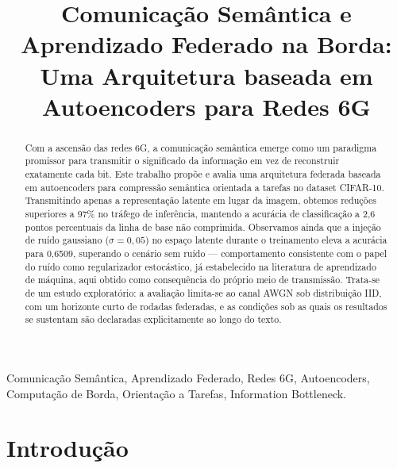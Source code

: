 \documentclass[conference]{IEEEtran}
\begin{document}
\title{Comunicação Semântica e Aprendizado Federado na Borda: Uma Arquitetura baseada em Autoencoders para Redes 6G}

\author{
}

\maketitle

\begin{abstract}
Com a ascensão das redes 6G, a comunicação semântica emerge como um paradigma promissor para transmitir o significado da informação em vez de reconstruir exatamente cada bit. Este trabalho propõe e avalia uma arquitetura federada baseada em autoencoders para compressão semântica orientada a tarefas no dataset CIFAR-10. Transmitindo apenas a representação latente em lugar da imagem, obtemos reduções superiores a 97\% no tráfego de inferência, mantendo a acurácia de classificação a 2,6 pontos percentuais da linha de base não comprimida. Observamos ainda que a injeção de ruído gaussiano ($\sigma=0,05$) no espaço latente durante o treinamento eleva a acurácia para 0,6509, superando o cenário sem ruído --- comportamento consistente com o papel do ruído como regularizador estocástico, já estabelecido na literatura de aprendizado de máquina, aqui obtido como consequência do próprio meio de transmissão. Trata-se de um estudo exploratório: a avaliação limita-se ao canal AWGN sob distribuição IID, com um horizonte curto de rodadas federadas, e as condições sob as quais os resultados se sustentam são declaradas explicitamente ao longo do texto.
\end{abstract}

\begin{IEEEkeywords}
Comunicação Semântica, Aprendizado Federado, Redes 6G, Autoencoders, Computação de Borda, Orientação a Tarefas, Information Bottleneck.
\end{IEEEkeywords}

\section{Introdução}
\end{document}
